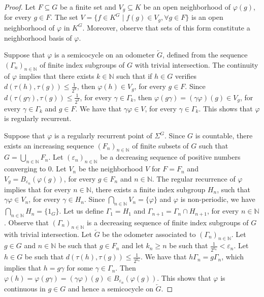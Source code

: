 \documentclass[titlepage,reqno,10pt]{amsart}
\theoremstyle{definition}
\begin{document}
\begin{proof}
 Let $F\subseteq G$ be a finite set and $V_g\subseteq K$ be an open neighborhood of $\varphi(g)$, for every $g\in F$. The set
$V=\{f\in K^G\mid  f(g) \in V_g, \forall g \in F\}$ is an open neighborhood of $\varphi$ in $K^G$. Moreover, observe that sets of this form constitute a neighborhood basis of $\varphi$. 

Suppose that $\varphi$ is a semicocycle on an odometer $\overleftarrow{G}$, defined from the sequence $(\Gamma_n)_{n\in\mathbb{N}}$  of finite index subgroups of $G$  with trivial intersection. 
The continuity of $\varphi$ implies that there exists $k\in\mathbb{N}$ such that if $h\in G$ verifies $d(\tau(h),\tau(g))\leq \frac{1}{2^k}$, then $\varphi(h)\in V_g$, for every $g\in F$.  Since $d(\tau(g\gamma),\tau(g))\leq \frac{1}{2^k}$, for every $\gamma \in \Gamma_k$, then $\varphi(g\gamma)=(\gamma\varphi)(g)\in V_g$, for every $\gamma\in \Gamma_k$ and $g\in F$.   We have that $\gamma\varphi \in V$, for every $\gamma\in \Gamma_k$. This shows that $\varphi$ is regularly recurrent.   

Suppose that $\varphi$ is a regularly recurrent point of $\Sigma^G$. Since $G$ is countable, there exists an increasing sequence $(F_n)_{n\in\mathbb{N}}$ of finite subsets of $G$ such that $G=\bigcup_{n\in\mathbb{N}}F_n$. Let $(\varepsilon_n)_{n\in\mathbb{N}}$ be a decreasing sequence of positive numbers converging to $0$. Let $V_n$ be the neighborhood $V$ for  $F=F_n$ and $V_g=B_{\varepsilon_n}(\varphi(g))$, for every $g\in F_n$ and  $n\in\mathbb{N}$. The regular recurrence of $\varphi$ implies that for every $n\in\mathbb{N}$, there exists a finite index subgroup $H_n$, such that $\gamma\varphi\in V_n$, for every $\gamma\in H_n$. Since $\bigcap_{n\in\mathbb{N}}V_n=\{\varphi\}$ and $\varphi$ is non-periodic, we have $\bigcap_{n\in\mathbb{N}}H_n=\{1_G\}$. Let us define $\Gamma_1=H_1$ and $\Gamma_{n+1}=\Gamma_n\cap H_{n+1}$, for every $n\in \mathbb{N}$. Observe that $(\Gamma_n)_{n\in\mathbb{N}}$ is a decreasing sequence of finite index  subgroups of $G$ with trivial intersection. Let $\overleftarrow{G}$ be the odometer associated to $(\Gamma_n)_{n\in\mathbb{N}}$.
Let $g\in G$ and $n\in\mathbb{N}$ be such that $g\in F_n$ and let $k_n\geq n$ be such that $\frac{1}{2^{k_n}}<\varepsilon_n$. 
Let $h\in G$ be such that $d(\tau(h),\tau(g))\leq \frac{1}{2^{k_n}}$. We have that $h\Gamma_n =g\Gamma_n$, which implies  that $h=g\gamma$ for some $\gamma\in \Gamma_n$. Then $\varphi(h)=\varphi( g\gamma)=(\gamma\varphi)(g)\in B_{\varepsilon_n}(\varphi(g))$. This shows that $\varphi$ is continuous in $g\in G$ and hence a semicocycle on $\overleftarrow{G}$.
\end{proof}
\end{document}
